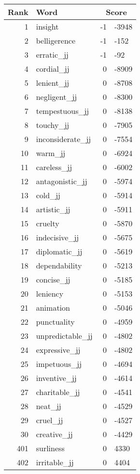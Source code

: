 \begin{longtable}[!htbp]{| rlr@{.}l |}
    \hline
    \textbf{Rank} & \textbf{Word} & \multicolumn{2}{c|}{\textbf{Score}} \\
    \hline
    \endhead
    1 & insight & -1 & -3948 \\
    2 & belligerence & -1 & -152 \\
    3 & erratic\_jj & -1 & -92 \\
    4 & cordial\_jj & 0 & -8909 \\
    5 & lenient\_jj & 0 & -8708 \\
    6 & negligent\_jj & 0 & -8300 \\
    7 & tempestuous\_jj & 0 & -8138 \\
    8 & touchy\_jj & 0 & -7905 \\
    9 & inconsiderate\_jj & 0 & -7554 \\
    10 & warm\_jj & 0 & -6924 \\
    11 & careless\_jj & 0 & -6002 \\
    12 & antagonistic\_jj & 0 & -5974 \\
    13 & cold\_jj & 0 & -5914 \\
    14 & artistic\_jj & 0 & -5911 \\
    15 & cruelty & 0 & -5870 \\
    16 & indecisive\_jj & 0 & -5675 \\
    17 & diplomatic\_jj & 0 & -5619 \\
    18 & dependability & 0 & -5213 \\
    19 & concise\_jj & 0 & -5185 \\
    20 & leniency & 0 & -5153 \\
    21 & animation & 0 & -5046 \\
    22 & punctuality & 0 & -4959 \\
    23 & unpredictable\_jj & 0 & -4802 \\
    24 & expressive\_jj & 0 & -4802 \\
    25 & impetuous\_jj & 0 & -4694 \\
    26 & inventive\_jj & 0 & -4614 \\
    27 & charitable\_jj & 0 & -4541 \\
    28 & neat\_jj & 0 & -4529 \\
    29 & cruel\_jj & 0 & -4527 \\
    30 & creative\_jj & 0 & -4429 \\
    401 & surliness & 0 & 4330 \\
    402 & irritable\_jj & 0 & 4404 \\

\end{longtable}
